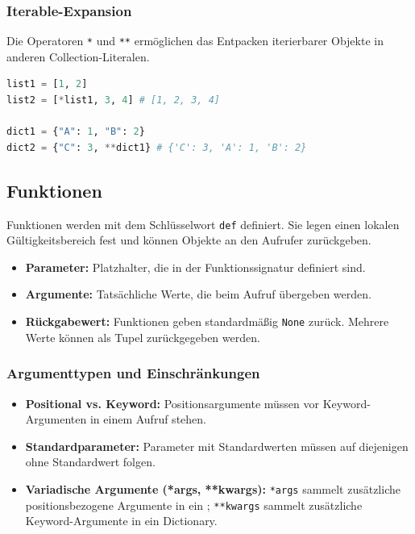 \subsubsection{Iterable-Expansion}
Die Operatoren \texttt{*} und \texttt{**} ermöglichen das Entpacken iterierbarer Objekte in anderen Collection-Literalen.

\begin{lstlisting}[language=Python]
list1 = [1, 2]
list2 = [*list1, 3, 4] # [1, 2, 3, 4]

dict1 = {"A": 1, "B": 2}
dict2 = {"C": 3, **dict1} # {'C': 3, 'A': 1, 'B': 2}
\end{lstlisting}

\subsection{Funktionen}
Funktionen werden mit dem Schlüsselwort \texttt{def} definiert. Sie legen einen lokalen Gültigkeitsbereich fest und können Objekte an den Aufrufer zurückgeben.

\begin{itemize}
    \item \textbf{Parameter:} Platzhalter, die in der Funktionssignatur definiert sind.
    \item \textbf{Argumente:} Tatsächliche Werte, die beim Aufruf übergeben werden.
    \item \textbf{Rückgabewert:} Funktionen geben standardmäßig \texttt{None} zurück. Mehrere Werte können als Tupel zurückgegeben werden.
\end{itemize}

\subsubsection{Argumenttypen und Einschränkungen}
\begin{itemize}
    \item \textbf{Positional vs. Keyword:} Positionsargumente müssen vor Keyword-Argumenten in einem Aufruf stehen.
    \item \textbf{Standardparameter:} Parameter mit Standardwerten müssen auf diejenigen ohne Standardwert folgen.
    \item \textbf{Variadische Argumente (*args, **kwargs):} \texttt{*args} sammelt zusätzliche positionsbezogene Argumente in ein 
    ; \texttt{**kwargs} sammelt zusätzliche Keyword-Argumente in ein Dictionary.
\end{itemize}

